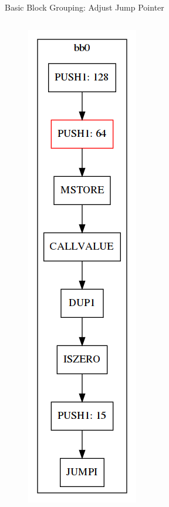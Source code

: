 \documentclass[11pt]{beamer}
\begin{document}
\begin{frame}{Basic Block Grouping: Adjust Jump Pointer}
\begin{columns}
{\begin{figure}
        \includegraphics[scale=0.25]{figures/stack/cfg_stack2.png}
    \end{figure}
}
\end{columns}
\end{frame}
\end{document}
